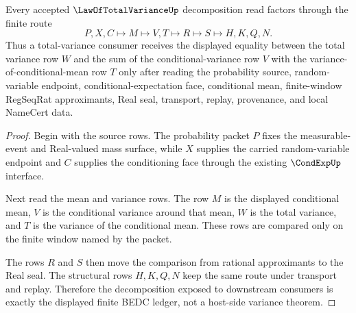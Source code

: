 \begin{theorem}
\label{thm:law-of-total-variance-conditional-mean-decomposition}
Every accepted $\LawOfTotalVarianceUp$ decomposition read factors through the finite route
$$
P,X,C \longmapsto M \longmapsto V,T \longmapsto R \longmapsto S \longmapsto H,K,Q,N .
$$
Thus a total-variance consumer receives the displayed equality between the total variance row $W$ and the sum of the conditional-variance row $V$ with the variance-of-conditional-mean row $T$ only after reading the probability source, random-variable endpoint, conditional-expectation face, conditional mean, finite-window RegSeqRat approximants, Real seal, transport, replay, provenance, and local NameCert data.
\end{theorem}
\begin{proof}
Begin with the source rows. The probability packet $P$ fixes the measurable-event and Real-valued mass surface, while $X$ supplies the carried random-variable endpoint and $C$ supplies the conditioning face through the existing $\CondExpUp$ interface.

Next read the mean and variance rows. The row $M$ is the displayed conditional mean, $V$ is the conditional variance around that mean, $W$ is the total variance, and $T$ is the variance of the conditional mean. These rows are compared only on the finite window named by the packet.

The rows $R$ and $S$ then move the comparison from rational approximants to the Real seal. The structural rows $H,K,Q,N$ keep the same route under transport and replay. Therefore the decomposition exposed to downstream consumers is exactly the displayed finite BEDC ledger, not a host-side variance theorem.
\end{proof}




